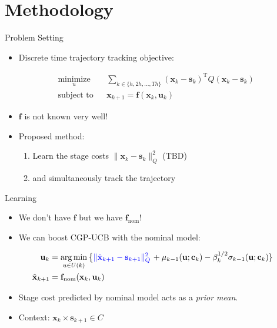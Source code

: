 \documentclass[handout]{beamer}
\newcommand{\state}{\mathbf{x}} %
\newcommand{\traj}{\mathbf{s}} %
\newcommand{\sysInput}{\mathbf{u}} %
\newcommand{\context}{\mathbf{c}} %
\begin{document}
\section{Methodology}
%
\begin{frame}{Problem Setting}
\begin{itemize}
\item Discrete time trajectory tracking objective: \pause
\end{itemize}
\begin{equation*}
\begin{aligned}
& \underset{u}{\text{minimize}}
& & \sum_{k \in \{h,2h,\ldots,Th\}} (\state_{k} - \traj_{k})^{\mathrm{T}}Q(\state_{k} - \traj_{k}) \\
& \text{subject to}
& & \state_{k+1} = \mathbf{f}(\state_k,\sysInput_k)
\end{aligned}
\end{equation*}
\pause
\begin{itemize}
\item $\mathbf{f}$ is not known very well! \pause
\item Proposed method: \pause
	\begin{enumerate}
	\item Learn the stage costs $\|\state_{k} - \traj_{k}\|_{Q}^{2}$ \pause (TBD)
	\item and  simultaneously track the trajectory
	\end{enumerate}
\end{itemize}
\end{frame}
%
\begin{frame}{Learning}
\begin{itemize}
\item We don't have $\mathbf{f}$ but we have $\mathbf{f}_{\mathrm{nom}}$! \pause
\item We can boost CGP-UCB with the nominal model: \pause
\end{itemize}
\begin{align}
\sysInput_{k} &= \operatorname*{arg\,min}_{u \in U(k)} \left\lbrace  \textcolor{blue}{\|\hat{\state}_{k+1} - \traj_{k+1}\|_{Q}^{2}} \right. 		+ \mu_{k-1}(\sysInput;\context_{k}) - \beta_k^{1/2}\sigma_{k-1}(\sysInput;\context_{k}) \rbrace \\
\hat{\state}_{k+1} &= \mathbf{f}_{\mathrm{nom}}(\state_k,\sysInput_k)
\end{align}
\begin{itemize}
\item Stage cost predicted by nominal model acts as a \emph{prior mean}. \pause
\item Context: $\state_{k} \times \traj_{k+1} \in C$
\end{itemize}
\end{frame}
\end{document}

